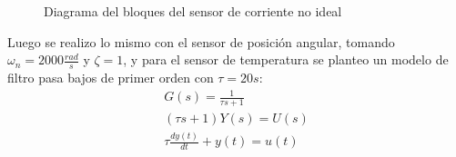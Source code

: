 \documentclass[a4paper, 10pt, onecolumn,journal]{ieeeconf}
\begin{document}
\begin{figure}[H]
	\centering
	\begin{adjustbox}{max width=\columnwidth}
	\end{adjustbox}
	\caption{Diagrama del bloques del sensor de corriente no ideal}
	\label{Diagrama del bloques del sensor de corriente no ideal}
\end{figure}
Luego se realizo lo mismo con el sensor de posición angular, tomando $\omega_n=2000\frac{rad}{s}$ y $\zeta = 1$, y para el sensor de temperatura se planteo un modelo de filtro pasa bajos de primer orden con $\tau=20 s$:
\begin{align}
	G(s) = \frac{1}{\tau s + 1}\\
	\left(\tau s + 1 \right) Y(s)=U(s)\\
	\tau \frac{d y(t)}{dt} +  y(t) = u(t) 
\end{align}
\end{document}
